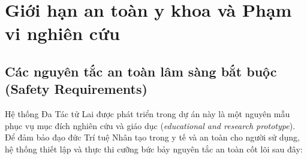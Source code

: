 \chapter{Giới hạn an toàn y khoa và Phạm vi nghiên cứu}
\label{chap:safety}

\section{Các nguyên tắc an toàn lâm sàng bắt buộc (Safety Requirements)}
\label{sec:safety-requirements}

Hệ thống Đa Tác tử Lai được phát triển trong dự án này là một nguyên mẫu phục vụ mục đích nghiên cứu và giáo dục (\emph{educational and research prototype}). Để đảm bảo đạo đức Trí tuệ Nhân tạo trong y tế và an toàn cho người sử dụng, hệ thống thiết lập và thực thi cưỡng bức bảy nguyên tắc an toàn cốt lõi sau đây:

